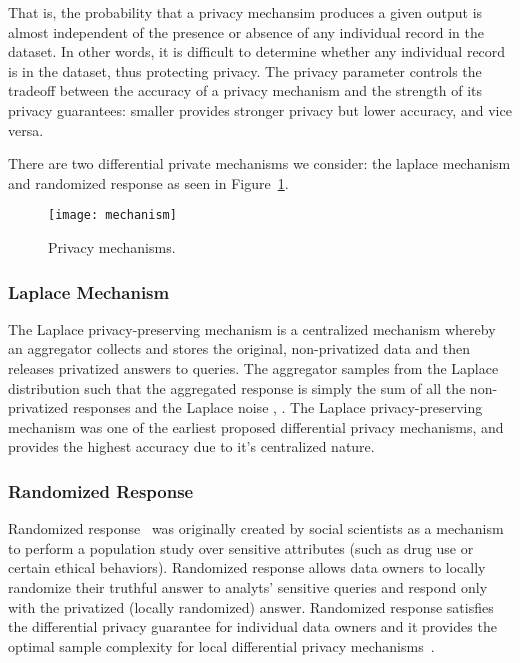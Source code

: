 \documentclass[conference]{IEEEtran}
\begin{document}
That is, the probability that a privacy mechansim  produces a given output is almost independent of the presence or absence of any individual record in the dataset.  In other words, it is difficult to determine whether any individual record is in the dataset, thus protecting privacy.  The privacy parameter  controls the tradeoff between the accuracy of a privacy mechanism and the strength of its privacy guarantees: smaller  provides stronger privacy but lower accuracy, and vice versa.

There are two differential private mechanisms we consider: the laplace mechanism and randomized response as seen in Figure~\ref{fig:mechanism}.

\begin{figure}[t!]
\centering
\texttt{[image: mechanism]}
\caption{Privacy mechanisms.}
\label{fig:mechanism}
\end{figure}

\subsubsection{Laplace Mechanism}

The Laplace privacy-preserving mechanism \cite{DBLP:conf/icalp/Dwork06,DBLP:conf/tcc/DworkMNS06,DBLP:journals/fttcs/DworkR14} is a centralized mechanism whereby an aggregator collects and stores the original, non-privatized data and then releases privatized answers to queries. The aggregator samples from the Laplace distribution such that the aggregated response  is simply the sum of all the non-privatized responses  and the Laplace noise , . The Laplace privacy-preserving mechanism was one of the earliest proposed differential privacy mechanisms, and provides the highest accuracy due to it's centralized nature.



\subsubsection{Randomized Response}
 
 
Randomized response~\cite{warner1965randomized} was originally created by social scientists as a mechanism to perform a population study over sensitive attributes (such as drug use or certain ethical behaviors). Randomized response allows data owners to locally randomize their truthful answer to analyts' sensitive queries and respond only with the privatized (locally randomized) answer. Randomized response satisfies the differential privacy guarantee for individual data owners and  it provides the optimal sample complexity for local differential privacy mechanisms~\cite{DBLP:conf/nips/DuchiWJ13}.
\end{document}
